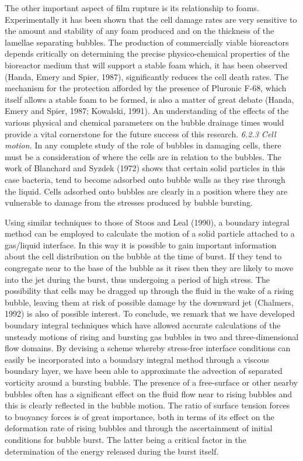 The other important aspect of film rupture is its relationship to foams.
Experimentally it has been shown that the cell damage rates are 
very sensitive to the amount and stability of any foam produced 
and on the thickness of the lamellae separating bubbles.
The production of commercially viable bioreactors
depends critically on determining the precise physico-chemical properties of the
bioreactor medium that will support a stable foam
which, it has been observed (Handa, Emery and Spier, 1987), significantly
reduces the cell death rates. The mechanism for the protection afforded by
the presence of Pluronic F-68, which itself allows a stable foam to be formed,
is also a matter of great debate (Handa, Emery and Spier, 1987; Kowalski, 1991).
An understanding of the effects of the various
physical and chemical parameters on the bubble drainage times
would provide a vital cornerstone for the future success of this research.
\vskip 15pt
\c{\it 6.2.3 Cell motion.}
\vskip 5pt
In any complete study of the role of bubbles in damaging cells, there
must be a consideration of where the cells are in relation to the bubbles.
The work of Blanchard and Syzdek (1972) shows that certain solid particles
in this case bacteria, tend to become adsorbed onto bubble walls as they rise 
through the liquid.
Cells adsorbed onto bubbles are clearly in a position where they are 
vulnerable to damage from the stresses produced by bubble bursting.

Using similar techniques to those of Stoos and Leal (1990), a 
boundary integral method can be employed to calculate the motion
of a solid particle attached to a gas/liquid interface. In this way it 
is possible to gain important
information about the cell distribution on the bubble at the time of burst.
If they tend to congregate near to the base of the bubble as it rises then they
are likely to move into the jet during the burst, thus undergoing a period 
of high stress.
The possibility that cells may be dragged up through
the fluid in the wake of a rising bubble, leaving them at risk
of possible damage by the downward jet (Chalmers, 1992) is also of possible
interest.
\vskip 40pt
To conclude, we remark that we have developed boundary integral 
techniques which have allowed accurate calculations of the 
unsteady motions of rising and bursting gas bubbles in 
two and three-dimensional
flow domains. 
By devising a scheme whereby stress-free
interface conditions can easily be incorporated into a boundary integral method
through a viscous boundary layer, we have been able to approximate the 
advection of separated vorticity around a bursting bubble.
The presence of a free-surface or other nearby bubbles 
often has a significant effect on the fluid flow near to rising bubbles
and this is clearly reflected in the bubble motion.
The ratio of surface tension forces to buoyancy forces is
of great importance, both in terms of its effect on the deformation rate 
of rising bubbles and through
the ascertainment of initial conditions for bubble burst.
The latter being a critical factor in the determination of the
energy released during the burst itself.

